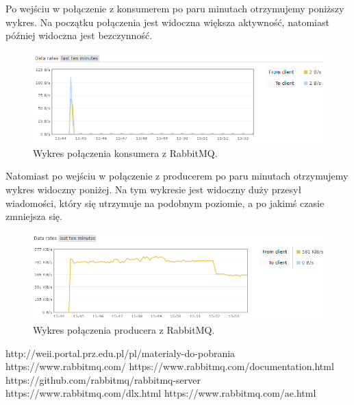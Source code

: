 \documentclass[12pt,twoside]{article}
\begin{document}
Po wejściu w połączenie z konsumerem po paru minutach otrzymujemy poniższy wykres. Na początku połączenia jest widoczna większa aktywność, natomiast później widoczna jest bezczynność.
\begin{figure}[!htb]
	\centering
	\includegraphics[width=1\textwidth]{figures/fig19}
	\caption{Wykres połączenia konsumera z RabbitMQ.}
	\label{fig:zdjecie}
\end{figure}
\clearpage


Natomiast po wejściu w połączenie z producerem po paru minutach otrzymujemy wykres widoczny poniżej. Na tym wykresie jest widoczny duży przesył wiadomości, który się utrzymuje na podobnym poziomie, a po jakimś czasie zmniejsza się.
\begin{figure}[!htb]
	\centering
	\includegraphics[width=1\textwidth]{figures/fig20}
	\caption{Wykres połączenia producera z RabbitMQ.}
	\label{fig:zdjecie}
\end{figure}



\clearpage
{}

\begin{thebibliography}{4}
 http://weii.portal.prz.edu.pl/pl/materialy-do-pobrania
 https://www.rabbitmq.com/
 https://www.rabbitmq.com/documentation.html
 https://github.com/rabbitmq/rabbitmq-server
 https://www.rabbitmq.com/dlx.html
 https://www.rabbitmq.com/ae.html
\end{thebibliography}

\clearpage
\end{document}

